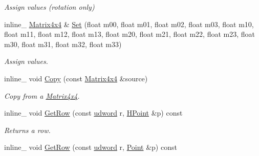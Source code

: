 \begin{DoxyCompactItemize}
\begin{DoxyCompactList}\small\item\em Assign values (rotation only) \end{DoxyCompactList}\item 
inline\+\_\+ \hyperlink{classOpcode_1_1Matrix4x4}{Matrix4x4} \& \hyperlink{classOpcode_1_1Matrix4x4_a97f156f68404f6ff4b8fd9ebff026b2e}{Set} (float m00, float m01, float m02, float m03, float m10, float m11, float m12, float m13, float m20, float m21, float m22, float m23, float m30, float m31, float m32, float m33)\hypertarget{classOpcode_1_1Matrix4x4_a97f156f68404f6ff4b8fd9ebff026b2e}{}\label{classOpcode_1_1Matrix4x4_a97f156f68404f6ff4b8fd9ebff026b2e}

\begin{DoxyCompactList}\small\item\em Assign values. \end{DoxyCompactList}\item 
inline\+\_\+ void \hyperlink{classOpcode_1_1Matrix4x4_a64a4dae72d2a7971ddc8753ed100e53b}{Copy} (const \hyperlink{classOpcode_1_1Matrix4x4}{Matrix4x4} \&source)\hypertarget{classOpcode_1_1Matrix4x4_a64a4dae72d2a7971ddc8753ed100e53b}{}\label{classOpcode_1_1Matrix4x4_a64a4dae72d2a7971ddc8753ed100e53b}

\begin{DoxyCompactList}\small\item\em Copy from a \hyperlink{classOpcode_1_1Matrix4x4}{Matrix4x4}. \end{DoxyCompactList}\item 
inline\+\_\+ void \hyperlink{classOpcode_1_1Matrix4x4_a2c619caa16561f6af7131945b501c541}{Get\+Row} (const \hyperlink{IceTypes_8h_a44c6f1920ba5551225fb534f9d1a1733}{udword} r, \hyperlink{classOpcode_1_1HPoint}{H\+Point} \&p) const \hypertarget{classOpcode_1_1Matrix4x4_a2c619caa16561f6af7131945b501c541}{}\label{classOpcode_1_1Matrix4x4_a2c619caa16561f6af7131945b501c541}

\begin{DoxyCompactList}\small\item\em Returns a row. \end{DoxyCompactList}\item 
inline\+\_\+ void \hyperlink{classOpcode_1_1Matrix4x4_a6fe40128c19c04d70db3eb9a7c31c33a}{Get\+Row} (const \hyperlink{IceTypes_8h_a44c6f1920ba5551225fb534f9d1a1733}{udword} r, \hyperlink{classOpcode_1_1Point}{Point} \&p) const \hypertarget{classOpcode_1_1Matrix4x4_a6fe40128c19c04d70db3eb9a7c31c33a}{}\label{classOpcode_1_1Matrix4x4_a6fe40128c19c04d70db3eb9a7c31c33a}


\end{DoxyCompactItemize}

